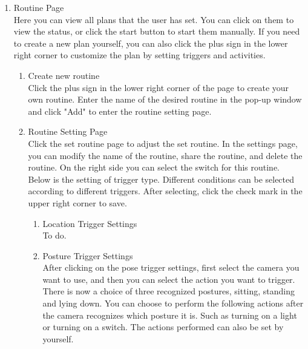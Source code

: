 \begin{enumerate}[label=\arabic*.]
    \item {\large{Routine Page}}\\
          Here you can view all plans that the user has set. You can click on them to view the status, or click the start button to start them manually. If you need to create a new plan yourself, you can also click the plus sign in the lower right corner to customize the plan by setting triggers and activities.\\
          \begin{enumerate}[label=\alph*]
              \item Create new routine\\
                    Click the plus sign in the lower right corner of the page to create your own routine. Enter the name of the desired routine in the pop-up window and click "Add" to enter the routine setting page.\\


              \item Routine Setting Page\\
                    Click the set routine page to adjust the set routine. In the settings page, you can modify the name of the routine, share the routine, and delete the routine. On the right side you can select the switch for this routine. Below is the setting of trigger type. Different conditions can be selected according to different triggers. After selecting, click the check mark in the upper right corner to save.\\
                    \begin{enumerate}
                        \item  Location Trigger Settings\\
                              To do.\\
                        \item  Posture Trigger Settings\\
                              After clicking on the pose trigger settings, first select the camera you want to use, and then you can select the action you want to trigger. There is now a choice of three recognized postures, sitting, standing and lying down. You can choose to perform the following actions after the camera recognizes which posture it is. Such as turning on a light or turning on a switch. The actions performed can also be set by yourself.\\


\end{enumerate}
\end{enumerate}
\end{enumerate}
